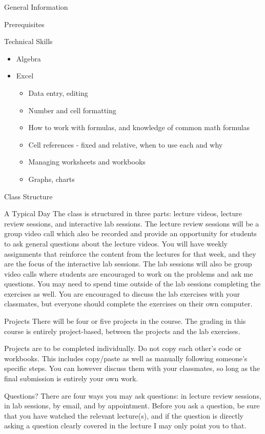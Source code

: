 \documentclass[11pt]{resume}
\begin{document}
\begin{section}{General Information}
\begin{subsection}{Prerequisites}
\begin{subsubsection}{Technical Skills}
\end{subsubsection}
\begin{itemize}
\item Algebra
\item Excel
\begin{itemize}
\item Data entry, editing
\item Number and cell formatting
\item How to work with formulas, and knowledge of common math formulas
\item Cell references - fixed and relative, when to use each and why
\item Managing worksheets and workbooks
\item Graphs, charts
\end{itemize}
\end{itemize}
\end{subsection}
\begin{subsection}{Class Structure}
\begin{subsubsection}{A Typical Day}
The class is structured in three parts: lecture videos, lecture review sessions, and interactive lab sessions.
The lecture review sessions will be a group video call which also be recorded and provide an opportunity 
for students to ask general questions about the lecture videos. You will have weekly assignments that 
reinforce the content from the lectures for that week, and they are the focus of the interactive lab sessions. 
The lab sessions will also be group video calls where students are encouraged to work on the problems 
and ask me questions. You may need to spend time outside of the lab sessions
completing the exercises as well. You are encouraged to discuss the lab exercises with your
classmates, but everyone should complete the exercises on their own computer.
\end{subsubsection}
\begin{subsubsection}{Projects}
There will be four or five projects in the course. The grading in this course is entirely project-based,
between the projects and the lab exercises.

Projects are to be completed individually. Do not copy each other’s code or workbooks. This includes
copy/paste as well as manually following someone’s specific steps. You can however discuss them with your
classmates, so long as the final submission is entirely your own work.
\end{subsubsection}
\begin{subsubsection}{Questions?}
There are four ways you may ask questions: in lecture review sessions, in lab sessions, by email,
and by appointment. Before you ask a question, be sure that you have watched the relevant lecture(s),
and if the question is directly asking a question clearly covered in the lecture I may only point 
you to that.
                

\end{subsubsection}
\end{subsection}
\end{section}
\end{document}
